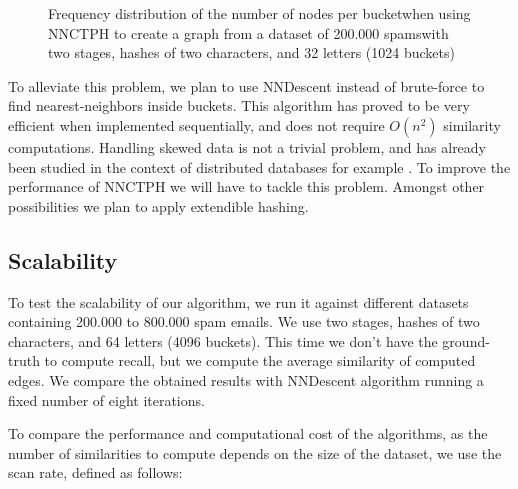 \documentclass[wcp]{jmlr}
\begin{document}
\begin{figure}
  \centering
  \newlength\figureheight
  \newlength\figurewidth
  \setlength\figureheight{6cm}
  \setlength\figurewidth{10cm}


\caption{Frequency distribution of the number of nodes per bucket\newline when using NNCTPH to create a graph from a dataset of 200.000 spams\newline with two stages, hashes of two characters, and 32 letters (1024 buckets)}
\label{figure:frequency}
\end{figure}

To alleviate this problem, we plan to use NNDescent instead of brute-force to find nearest-neighbors inside buckets. This algorithm has proved to be very efficient when implemented sequentially, and does not require $O(n^2)$ similarity computations. Handling skewed data is not a trivial problem, and has already been studied in the context of distributed databases for example \cite{Xu:2008:HDS:1376616.1376720}. To improve the performance of NNCTPH we will have to tackle this problem. Amongst other possibilities we plan to apply extendible hashing.

\subsection{Scalability}

To test the scalability of our algorithm, we run it against different datasets containing 200.000 to 800.000 spam emails. We use two stages, hashes of two characters, and 64 letters (4096 buckets). This time we don't have the ground-truth to compute recall, but we compute the average similarity of computed edges. We compare the obtained results with NNDescent algorithm running a fixed number of eight iterations.

To compare the performance and computational cost of the algorithms, as the number of similarities to compute depends on the size of the dataset, we use the scan rate, defined as follows:
\end{document}
